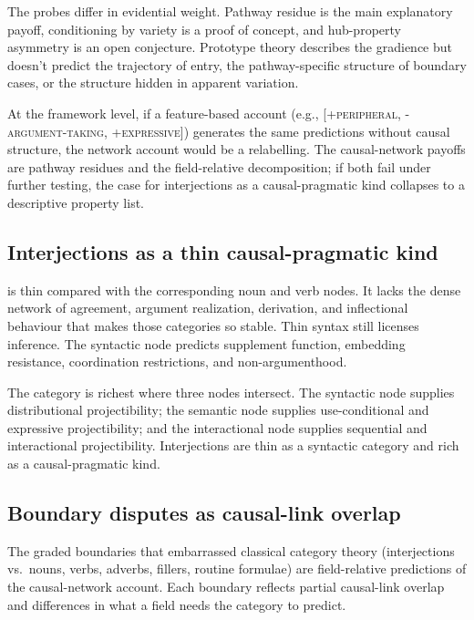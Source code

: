 \documentclass[12pt]{article}
\begin{document}
The probes differ in evidential weight. Pathway residue is the main
explanatory payoff, conditioning by variety is a proof of concept, and
hub-property asymmetry is an open conjecture. Prototype theory describes
the gradience but doesn't predict the trajectory of entry, the
pathway-specific structure of boundary cases, or the structure hidden in
apparent variation.

At the framework level, if a feature-based account
(e.g., [\textsc{+peripheral}, \textsc{-argument-taking},
\textsc{+expressive}]) generates the same predictions without causal
structure, the network account would be a relabelling. The
causal-network payoffs are pathway residues and the field-relative
decomposition; if both fail under further testing, the case for
interjections as a causal-pragmatic kind collapses to a descriptive
property list.

\subsection{Interjections as a thin causal-pragmatic kind}

 is thin compared with the
corresponding noun and verb nodes. It lacks the dense network of
agreement, argument realization, derivation, and inflectional behaviour
that makes those categories so stable. Thin syntax still licenses
inference. The syntactic node predicts supplement function, embedding
resistance, coordination restrictions, and non-argumenthood.

The category is richest where three nodes intersect. The syntactic node
supplies distributional projectibility; the semantic node supplies
use-conditional and expressive projectibility; and the interactional
node supplies sequential and interactional projectibility. Interjections
are thin as a syntactic category and rich as a causal-pragmatic kind.

\subsection{Boundary disputes as causal-link overlap}\label{sec:boundaries}

The graded boundaries that embarrassed classical category theory
(interjections vs.\ nouns, verbs, adverbs, fillers, routine formulae)
are field-relative predictions of the causal-network account. Each
boundary reflects partial causal-link overlap and differences in what a
field needs the category to predict.
\end{document}
